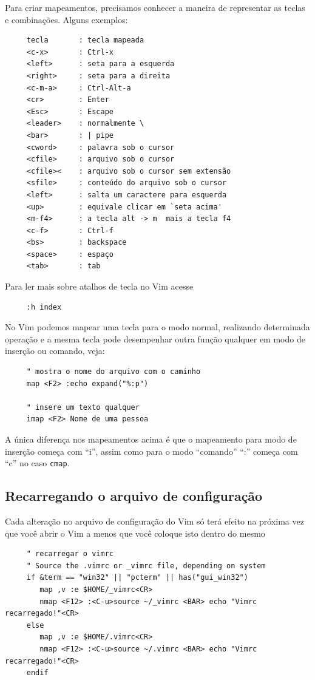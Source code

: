 \documentclass[10pt,a4paper,openany]{book}
\begin{document}
Para criar mapeamentos, precisamos conhecer a maneira de representar
as teclas e combinações. Alguns exemplos:

\begin{verbatim}
     tecla       : tecla mapeada
     <c-x>       : Ctrl-x
     <left>      : seta para a esquerda
     <right>     : seta para a direita
     <c-m-a>     : Ctrl-Alt-a
     <cr>        : Enter
     <Esc>       : Escape
     <leader>    : normalmente \
     <bar>       : | pipe
     <cword>     : palavra sob o cursor
     <cfile>     : arquivo sob o cursor
     <cfile><    : arquivo sob o cursor sem extensão
     <sfile>     : conteúdo do arquivo sob o cursor
     <left>      : salta um caractere para esquerda
     <up>        : equivale clicar em `seta acima'
     <m-f4>      : a tecla alt -> m  mais a tecla f4
     <c-f>       : Ctrl-f
     <bs>        : backspace
     <space>     : espaço
     <tab>       : tab
\end{verbatim}

Para ler mais sobre atalhos de tecla no Vim acesse 

\begin{verbatim}
     :h index
\end{verbatim}

No Vim podemos mapear uma tecla para o modo normal, realizando
determinada operação e a mesma tecla pode desempenhar outra função
qualquer em modo de inserção ou comando, veja:

\begin{verbatim}
     " mostra o nome do arquivo com o caminho
     map <F2> :echo expand("%:p")
     
     " insere um texto qualquer
     imap <F2> Nome de uma pessoa
\end{verbatim}

A única diferença nos mapeamentos acima é que o mapeamento para modo
de inserção começa com ``i'', assim como para o modo ``comando'' ``:'' começa
com ``c'' no caso \verb|cmap|.

\subsection{Recarregando o arquivo de configuração}
\label{sec:Recarregando o arquivo de configuração}

Cada alteração no arquivo de configuração do Vim só terá efeito na próxima vez que você
abrir o Vim a menos que você coloque isto dentro do mesmo

\begin{verbatim}
     " recarregar o vimrc
     " Source the .vimrc or _vimrc file, depending on system
     if &term == "win32" || "pcterm" || has("gui_win32")
        map ,v :e $HOME/_vimrc<CR>
        nmap <F12> :<C-u>source ~/_vimrc <BAR> echo "Vimrc recarregado!"<CR>
     else
        map ,v :e $HOME/.vimrc<CR>
        nmap <F12> :<C-u>source ~/.vimrc <BAR> echo "Vimrc recarregado!"<CR>
     endif
\end{verbatim}
\end{document}
